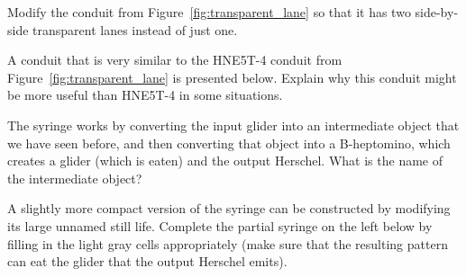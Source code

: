 \begin{multicols}{2}
	
	\mfilbreak
	
	
	\begin{problem}\label{exer:two_transparent_lanes}
		Modify the conduit from Figure~\ref{fig:transparent_lane} so that it has two side-by-side transparent lanes instead of just one.
		
	\end{problem}
	
	
	\mfilbreak
	
	
	\begin{problem}\label{exer:H_to_G_transparent_better}
		A conduit that is very similar to the HNE5T-4 conduit from Figure~\ref{fig:transparent_lane} is presented below. Explain why this conduit might be more useful than HNE5T-4 in some situations.
		
		\begin{center}
		\end{center}
	\end{problem}
	
	
	\mfilbreak
	
	
	\begin{problem}\label{exer:syringe_creates_pi}
		The syringe works by converting the input glider into an intermediate object that we have seen before, and then converting that object into a B-heptomino, which creates a glider (which is eaten) and the output Herschel. What is the name of the intermediate object?
	\end{problem}
	
	
	\mfilbreak
	
	
	\begin{problem}\label{exer:syringe_compact}
		A slightly more compact version of the syringe can be constructed by modifying its large unnamed still life. Complete the partial syringe on the left below by filling in the light gray cells appropriately (make sure that the resulting pattern can eat the glider that the output Herschel emits).
		
		\begin{center}
			~\quad~
		\end{center}
		
	\end{problem}
	

\end{multicols}
